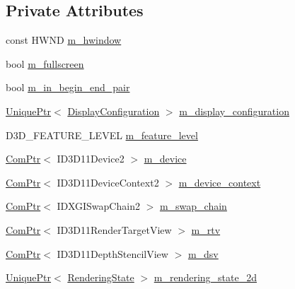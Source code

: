 \subsection*{Private Attributes}
\begin{DoxyCompactItemize}
\item 
const H\+W\+ND \hyperlink{classmage_1_1_renderer_adadc1028e5ad6551abbecfd8529e4aa1}{m\+\_\+hwindow}
\item 
bool \hyperlink{classmage_1_1_renderer_a72bb88b17491bd388460afae9d207b0a}{m\+\_\+fullscreen}
\item 
bool \hyperlink{classmage_1_1_renderer_a3caa1bad6cbfde8f87f807e5c97924e3}{m\+\_\+in\+\_\+begin\+\_\+end\+\_\+pair}
\item 
\hyperlink{namespacemage_a3316d7143a973e37adf1110f2e80ca31}{Unique\+Ptr}$<$ \hyperlink{structmage_1_1_display_configuration}{Display\+Configuration} $>$ \hyperlink{classmage_1_1_renderer_ab5638066fba5a0b9ce307f7db3ba5433}{m\+\_\+display\+\_\+configuration}
\item 
D3\+D\+\_\+\+F\+E\+A\+T\+U\+R\+E\+\_\+\+L\+E\+V\+EL \hyperlink{classmage_1_1_renderer_aa97b108ef58f7d41ddb527f6ba2bfdf9}{m\+\_\+feature\+\_\+level}
\item 
\hyperlink{namespacemage_ae74f374780900893caa5555d1031fd79}{Com\+Ptr}$<$ I\+D3\+D11\+Device2 $>$ \hyperlink{classmage_1_1_renderer_aecf4bcb70dc186b4f2083df38d1e4bc3}{m\+\_\+device}
\item 
\hyperlink{namespacemage_ae74f374780900893caa5555d1031fd79}{Com\+Ptr}$<$ I\+D3\+D11\+Device\+Context2 $>$ \hyperlink{classmage_1_1_renderer_a47c4a1d46e84bbdc3ec876809633877e}{m\+\_\+device\+\_\+context}
\item 
\hyperlink{namespacemage_ae74f374780900893caa5555d1031fd79}{Com\+Ptr}$<$ I\+D\+X\+G\+I\+Swap\+Chain2 $>$ \hyperlink{classmage_1_1_renderer_a5419a7a11e8f0f69e92dd6a5cb9bd217}{m\+\_\+swap\+\_\+chain}
\item 
\hyperlink{namespacemage_ae74f374780900893caa5555d1031fd79}{Com\+Ptr}$<$ I\+D3\+D11\+Render\+Target\+View $>$ \hyperlink{classmage_1_1_renderer_a86ed436120830cef3e0173f85550aa50}{m\+\_\+rtv}
\item 
\hyperlink{namespacemage_ae74f374780900893caa5555d1031fd79}{Com\+Ptr}$<$ I\+D3\+D11\+Depth\+Stencil\+View $>$ \hyperlink{classmage_1_1_renderer_a27a62437e26957890563a68ebcde1909}{m\+\_\+dsv}
\item 
\hyperlink{namespacemage_a3316d7143a973e37adf1110f2e80ca31}{Unique\+Ptr}$<$ \hyperlink{structmage_1_1_rendering_state}{Rendering\+State} $>$ \hyperlink{classmage_1_1_renderer_ab55bf9fc3a357358d07419ec25dbe510}{m\+\_\+rendering\+\_\+state\+\_\+2d}

\end{DoxyCompactItemize}
